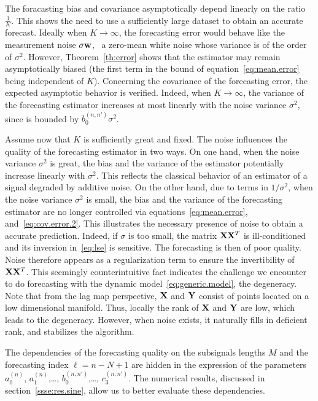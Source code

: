 The foracasting bias and covariance asymptotically depend linearly on the ratio $\frac{1}{K}$. This shows the need to use a sufficiently large dataset to obtain an accurate forecast. Ideally when $K\to\infty$, the forecasting error would behave like the measurement noise $\sigma{\mathbf w}$, \ie~a zero-mean white noise whose variance is of the order of $\sigma^2$. However, Theorem~\ref{th:error} shows that the estimator may remain asymptotically biased (the first term in the bound of equation~\eqref{eq:mean.error} being independent of $K$). Concerning the covariance of the forecasting error, the expected asymptotic behavior is verified. Indeed, when $K \to\infty$, the variance of the forecasting estimator increases at most linearly with the noise variance $\sigma^2$, since is bounded by $b_0^{(n,n')}\sigma^2$.

Assume now that $K$ is sufficiently great and fixed. The noise influences the quality of the forecasting estimator in two ways. On one hand, when the noise variance $\sigma^2$ is great, the bias and the variance of the estimator potentially increase linearly with $\sigma^2$. This reflects the classical behavior of an estimator of a signal degraded by additive noise. On the other hand, due to terms in $1/\sigma^2$, when the noise variance $\sigma^2$ is small, the bias and the variance of the forecasting estimator are no longer controlled via equations~\eqref{eq:mean.error}, and~\eqref{eq:cov.error.2}. This illustrates the necessary presence of noise to obtain a accurate prediction. Indeed, if $\sigma$ is too small, the matrix ${\mathbf X}{\mathbf X}^T$ is ill-conditioned and its inversion in~\eqref{eq:lse} is sensitive. The forecasting is then of poor quality. Noise therefore appears as a regularization term to ensure the invertibility of ${\mathbf X}{\mathbf X}^T$. This seemingly counterintuitive fact indicates the challenge we encounter to do forecasting with the dynamic model~\eqref{eq:generic.model}, the degeneracy. Note that from the lag map perspective, ${\mathbf X}$ and ${\mathbf Y}$ consist of points located on a low dimensional manifold. Thus, locally the rank of ${\mathbf X}$ and ${\mathbf Y}$ are low, which leads to the degeneracy. However, when noise exists, it naturally fills in deficient rank, and stabilizes the algorithm. 


The dependencies of the forecasting quality on the subsignals lengths $M$ and the forecasting index $\ell=n-N+1$ are hidden in the expression of the parameters $a^{(n)}_0$, $a^{(n)}_1$,\dots, $b^{(n,n')}_0$,\dots, $c^{(n,n')}_3$. The numerical results, discussed in section~\ref{ssse:res.sine}, allow us to better evaluate these dependencies.

